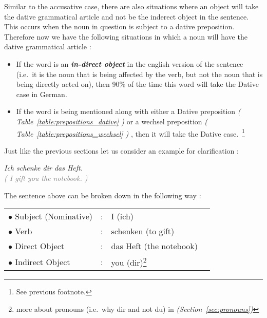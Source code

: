 \documentclass[a4paper,twocolumn,10pt]{article}
\newcommand{\newpar}
{\par \vspace{0.3cm}}
\newcommand{\bulletpoint}
{ $\bullet$  }
\begin{document}
\vspace{0.5cm}

\linenumbers


Similar to the accusative case, there are also situations where an object will
take the dative grammatical article and not be the inderect object in the
sentence. This occurs when the noun in question is subject to a dative
preposition. Therefore now we have the following situations in which a noun will
have the dative grammatical article :\newpar

\nolinenumbers
\begin{itemize}[noitemsep]

	\item If the word is an \textbf{\textit{in-direct object}} in the english
		version of the sentence (i.e.\ it is the noun that is being affected by
		the verb, but not the noun that is being directly acted on), then 90\%
		of the time this word will take the Dative case in German.

   \item If the word is being mentioned along with either a Dative preposition
	   \textit{( Table~\ref{table:prepositions_dative} )} or a wechsel
	   preposition \textit{( Table~\ref{table:prepositions_wechsel} )} , then it
	   will take the Dative case.~\footnote{See previous footnote.} 

\end{itemize}
\linenumbers

Just like the previous sections let us consider an example for clarification
:\newpar

\noindent
\textit{Ich schenke dir das Heft.}\\
\textcolor{gray} { \textit{( I gift you the notebook. )} } \newpar

The sentence above can be broken down in the following way :


\nolinenumbers

\vspace{0.2cm}

\begin{tabularx}{0.95\linewidth}{lllX}

\rowcolor{white} \bulletpoint Subject (Nominative) & : & I (ich)   & \\
\rowcolor{white} \bulletpoint Verb                 & : & schenken (to gift) & \\
\rowcolor{white} \bulletpoint Direct Object        & : & das Heft (the notebook)  & \\
\rowcolor{white} \bulletpoint Indirect Object      & : & you (dir)\footnote{more
about pronouns (i.e.\ why dir and not du) in \textit{(Section~\ref{sec:pronouns})}  } & \\

\end{tabularx}
\end{document}
